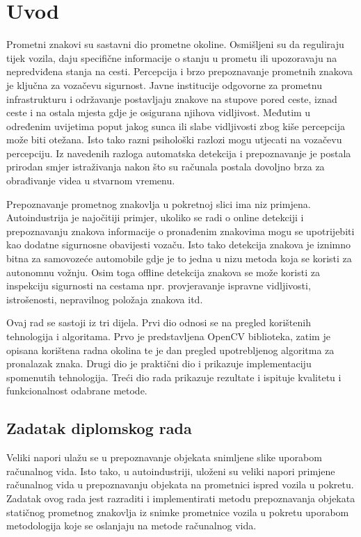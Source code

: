 \newpage

\setcounter{page}{1}
\setcounter{figure}{0}
\section{Uvod}%
\label{sec:Uvod}

Prometni znakovi su sastavni dio prometne okoline. Osmišljeni su da
reguliraju tijek vozila, daju specifične informacije o stanju u prometu
ili upozoravaju na nepredviđena stanja na cesti. Percepcija i brzo
prepoznavanje prometnih znakova je ključna za vozačevu sigurnost. Javne
institucije odgovorne za prometnu infrastrukturu i održavanje
postavljaju znakove na stupove pored ceste, iznad ceste i na ostala
mjesta gdje je osigurana njihova vidljivost. Međutim u određenim
uvijetima poput jakog sunca ili slabe vidljivosti zbog kiše percepcija
može biti otežana. Isto tako razni psihološki razlozi mogu utjecati na
vozačevu percepciju. Iz navedenih razloga automatska detekcija i
prepoznavanje je postala prirodan smjer istraživanja nakon što su
računala postala dovoljno brza za obrađivanje videa u stvarnom vremenu.   

Prepoznavanje prometnog znakovlja u pokretnoj slici ima niz primjena.
Autoindustrija je najočitiji primjer, ukoliko se radi o online detekciji
i prepoznavanju znakova informacije o pronađenim znakovima mogu se
upotrijebiti kao dodatne sigurnosne obavijesti vozaču. Isto tako
detekcija znakova je iznimno bitna za samovozeće automobile gdje je to
jedna u nizu metoda koja se koristi za autonomnu vožnju. Osim toga
offline detekcija znakova se može koristi za inspekciju sigurnosti na
cestama npr. provjeravanje ispravne vidljivosti, istrošenosti,
nepravilnog položaja znakova itd. 

Ovaj rad se sastoji iz tri dijela. Prvi dio odnosi se na pregled
korištenih tehnologija i algoritama. Prvo je predstavljena OpenCV
biblioteka, zatim je opisana korištena radna okolina te je dan pregled
upotrebljenog algoritma za pronalazak znaka. Drugi dio je praktični
dio i prikazuje implementaciju spomenutih tehnologija. Treći dio rada
prikazuje rezultate i ispituje kvalitetu i funkcionalnost odabrane
metode.


\newpage
\subsection{Zadatak diplomskog rada} %
\label{sub:Zadatak diplomskog rada}
Veliki napori ulažu se u prepoznavanje objekata snimljene slike uporabom
računalnog vida. Isto tako, u autoindustriji, uloženi su veliki napori
primjene računalnog vida u prepoznavanju objekata na prometnici ispred
vozila u pokretu. Zadatak ovog rada jest razraditi i implementirati
metodu prepoznavanja objekata statičnog prometnog znakovlja iz snimke
prometnice vozila u pokretu uporabom metodologija koje se oslanjaju na
metode računalnog vida.

